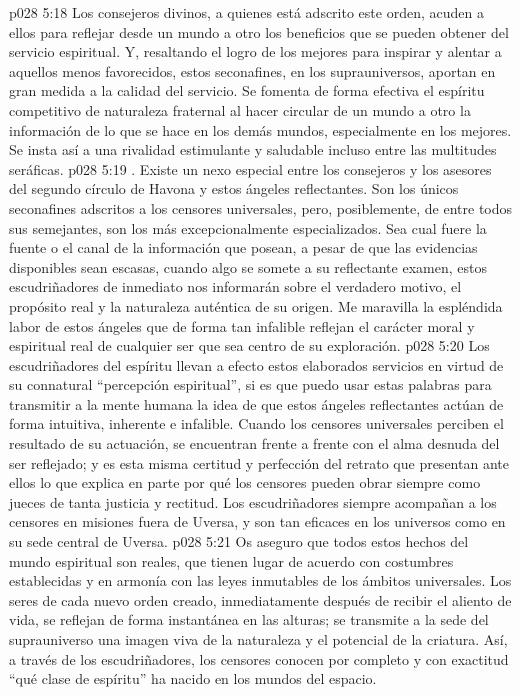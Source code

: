 \vs p028 5:18 Los consejeros divinos, a quienes está adscrito este orden, acuden a ellos para reflejar desde un mundo a otro los beneficios que se pueden obtener del servicio espiritual. Y, resaltando el logro de los mejores para inspirar y alentar a aquellos menos favorecidos, estos seconafines, en los suprauniversos, aportan en gran medida a la calidad del servicio. Se fomenta de forma efectiva el espíritu competitivo de naturaleza fraternal al hacer circular de un mundo a otro la información de lo que se hace en los demás mundos, especialmente en los mejores. Se insta así a una rivalidad estimulante y saludable incluso entre las multitudes seráficas.
\vs p028 5:19 . Existe un nexo especial entre los consejeros y los asesores del segundo círculo de Havona y estos ángeles reflectantes. Son los únicos seconafines adscritos a los censores universales, pero, posiblemente, de entre todos sus semejantes, son los más excepcionalmente especializados. Sea cual fuere la fuente o el canal de la información que posean, a pesar de que las evidencias disponibles sean escasas, cuando algo se somete a su reflectante examen, estos escudriñadores de inmediato nos informarán sobre el verdadero motivo, el propósito real y la naturaleza auténtica de su origen. Me maravilla la espléndida labor de estos ángeles que de forma tan infalible reflejan el carácter moral y espiritual real de cualquier ser que sea centro de su exploración.
\vs p028 5:20 Los escudriñadores del espíritu llevan a efecto estos elaborados servicios en virtud de su connatural “percepción espiritual”, si es que puedo usar estas palabras para transmitir a la mente humana la idea de que estos ángeles reflectantes actúan de forma intuitiva, inherente e infalible. Cuando los censores universales perciben el resultado de su actuación, se encuentran frente a frente con el alma desnuda del ser reflejado; y es esta misma certitud y perfección del retrato que presentan ante ellos lo que explica en parte por qué los censores pueden obrar siempre como jueces de tanta justicia y rectitud. Los escudriñadores siempre acompañan a los censores en misiones fuera de Uversa, y son tan eficaces en los universos como en su sede central de Uversa.
\vs p028 5:21 Os aseguro que todos estos hechos del mundo espiritual son reales, que tienen lugar de acuerdo con costumbres establecidas y en armonía con las leyes inmutables de los ámbitos universales. Los seres de cada nuevo orden creado, inmediatamente después de recibir el aliento de vida, se reflejan de forma instantánea en las alturas; se transmite a la sede del suprauniverso una imagen viva de la naturaleza y el potencial de la criatura. Así, a través de los escudriñadores, los censores conocen por completo y con exactitud “qué clase de espíritu” ha nacido en los mundos del espacio.
